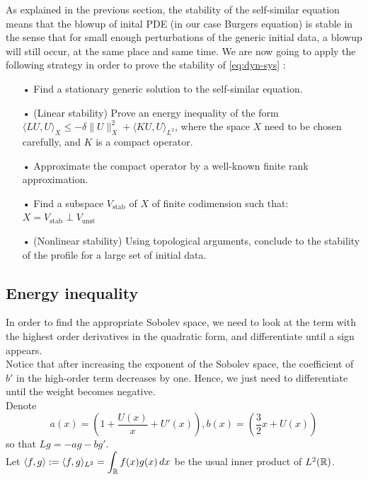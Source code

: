 \documentclass[11pt,a4paper]{article}
\begin{document}
As explained in the previous section, the stability of the self-similar equation means that the blowup of inital PDE (in our case Burgers equation) is stable in the sense that for small enough perturbations of the generic initial data, a blowup will still occur, at the same place and same time. We are now going to apply the following strategy in order to prove the stability of \ref{eq:dyn-sys} :
\begin{enumerate}
\item[•]Find a stationary generic solution to the self-similar equation.
\item[•] (Linear stability) Prove an energy inequality of the form
$\langle  L U, U \rangle_X \leq -\delta \| U \|_X^2 + \langle KU, U \rangle_{L^2}$,
where the space $X$ need to be chosen carefully, and $K$ is a compact operator.
\item[•]Approximate the compact operator by a well-known finite rank approximation.
\item[•] Find a subspace $V_{\text{stab}}$ of $X$ of finite codimension such that: $X = V_{\text{stab}} \perp V_{\text{unst}}$
\item[•] (Nonlinear stability) Using topological arguments, conclude to the stability of the profile for a large set of initial data.
\end{enumerate}

\subsection{Energy inequality}

In order to find the appropriate Sobolev space, we need to look at the term with the highest order derivatives in the quadratic form, and differentiate until a sign appears. \\
 Notice that after increasing the exponent of the Sobolev space, the coefficient of $b'$ in the high-order term decreases by one. Hence, we just need to differentiate until the weight becomes negative. \\

Denote
\begin{equation}\label{eq:def-a-and-b}
    a(x) = \left(1+\frac{U(x)}{x} + U'(x)\right), b(x) = \left(\frac{3}{2}x + U(x)\right)
\end{equation}
so that $Lg = -ag - bg'$.\\

Let $\langle f, g \rangle := \langle f, g \rangle_{L^2} = \displaystyle \int_\mathbb R  f(x)g(x)\,dx$ be the usual inner product of $L^2(\mathbb R)$.
\end{document}
